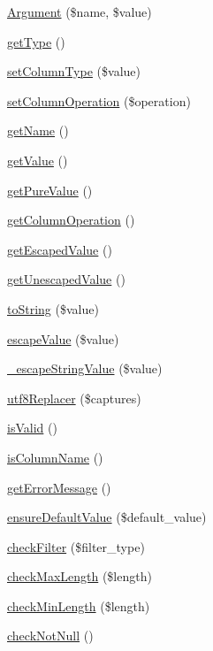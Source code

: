 \begin{DoxyCompactItemize}
\item 
\hyperlink{classArgument_aa9089313bf5ad3d10939dc1e70ee84fe}{Argument} (\$name, \$value)
\item 
\hyperlink{classArgument_a62ea3d6e7689c8a40f6f9722e76fa7a8}{get\+Type} ()
\item 
\hyperlink{classArgument_a849c6abe0d16f2fdf21c38db6844bd9d}{set\+Column\+Type} (\$value)
\item 
\hyperlink{classArgument_a3e737e0b4af5559f56b35c7c1b1b4f2a}{set\+Column\+Operation} (\$operation)
\item 
\hyperlink{classArgument_a592176260424f46cf1b83bf2eb14014e}{get\+Name} ()
\item 
\hyperlink{classArgument_a53b70d0071096047437015737d5d7728}{get\+Value} ()
\item 
\hyperlink{classArgument_a54140067b590d8ce8dcd7d09f56519cd}{get\+Pure\+Value} ()
\item 
\hyperlink{classArgument_a8720ec6d3b4cccdb6dfdd072bb77c9d3}{get\+Column\+Operation} ()
\item 
\hyperlink{classArgument_a02ee73fa63dd2cd754412f176dae54da}{get\+Escaped\+Value} ()
\item 
\hyperlink{classArgument_a45a70c173c816e9cf2c7c5f396a92a6f}{get\+Unescaped\+Value} ()
\item 
\hyperlink{classArgument_a6fa3a8b473d05a02c7746a143e51ef81}{to\+String} (\$value)
\item 
\hyperlink{classArgument_a217bae48930e0208210aa7030a2f2b27}{escape\+Value} (\$value)
\item 
\hyperlink{classArgument_afd7b071db98f0a4c8ef60cdd8db8a3b2}{\+\_\+escape\+String\+Value} (\$value)
\item 
\hyperlink{classArgument_aaf7f8b67195ed2e1b404339d107d6a1c}{utf8\+Replacer} (\$captures)
\item 
\hyperlink{classArgument_a3e07b6c495166e96aea4e4f90bb0fe53}{is\+Valid} ()
\item 
\hyperlink{classArgument_aced37db9a6cf1ec57e8acdea23797927}{is\+Column\+Name} ()
\item 
\hyperlink{classArgument_a6e75159f2fad478ff488bf9cff5ba139}{get\+Error\+Message} ()
\item 
\hyperlink{classArgument_a4af92bc005f3d9328c63c0722fd3aef7}{ensure\+Default\+Value} (\$default\+\_\+value)
\item 
\hyperlink{classArgument_a4bdf58953a9b85a8999edabe5d341d43}{check\+Filter} (\$filter\+\_\+type)
\item 
\hyperlink{classArgument_acc5f170121988acf71c50e5941320112}{check\+Max\+Length} (\$length)
\item 
\hyperlink{classArgument_ac44c716b86dc42d5c0f0e4717a510c74}{check\+Min\+Length} (\$length)
\item 
\hyperlink{classArgument_a09edcec0bf4dbfeedec2f7652e44e57d}{check\+Not\+Null} ()
\end{DoxyCompactItemize}
